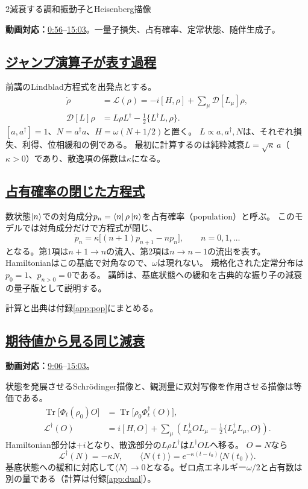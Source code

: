 \documentclass[a4paper,11pt]{ltjsarticle}
\newcommand{\subsectionlink}[1]{\subsection[#1]{\hyperlink{toc}{#1}}}
\numberwithin{equation}{section}
\newcommand{\Tr}{\operatorname{Tr}}
\newcommand{\Diss}{\mathcal{D}}
\newcommand{\av}[1]{\langle #1\rangle}
\newcommand{\video}[2]{\href{https://www.youtube.com/watch?v=RYxzcUhIHjk\&t=#1s}{#2}}
\newcommand{\videosource}[1]{\par\noindent\textcolor{noteblue}{\textbf{動画対応：}#1}\par\smallskip}
\begin{document}
\begin{lecturesection}{2}{減衰する調和振動子とHeisenberg描像}
\label{sec:damping}
\videosource{\video{56}{0:56}--\video{903}{15:03}。一量子損失、占有確率、定常状態、随伴生成子。}
\subsectionlink{ジャンプ演算子が表す過程}
前講のLindblad方程式を出発点とする。
\begin{align}
 \dot\rho&=\mathcal L(\rho)=-i[H,\rho]+\sum_\mu\Diss[L_\mu]\rho,
 \label{eq:lindblad}\\
 \Diss[L]\rho&=L\rho L^\dagger-\frac12\{L^\dagger L,\rho\}.
\end{align}
$[a,a^\dagger]=1$、$N=a^\dagger a$、$H=\omega(N+1/2)$と置く。
$L\propto a,a^\dagger,N$は、それぞれ損失、利得、位相緩和の例である。
最初に計算するのは純粋減衰$L=\sqrt\kappa\,a$（$\kappa>0$）であり、散逸項の係数は$\kappa$になる。

\subsectionlink{占有確率の閉じた方程式}
数状態$\ket n$での対角成分$p_n=\bra n\rho\ket n$を占有確率（population）と呼ぶ。
このモデルでは対角成分だけで方程式が閉じ、
\begin{equation}
 \dot p_n=\kappa\bigl[(n+1)p_{n+1}-np_n\bigr],\qquad n=0,1,\ldots
 \label{eq:pauli}
\end{equation}
となる。第1項は$n+1\to n$の流入、第2項は$n\to n-1$の流出を表す。
Hamiltonianはこの基底で対角なので、$\omega$は現れない。
規格化された定常分布は$p_0=1$、$p_{n>0}=0$である。
講師は、基底状態への緩和を古典的な振り子の減衰の量子版として説明する。

\par\noindent 計算と出典は付録\ref{app:pop}にまとめる。

\subsectionlink{期待値から見る同じ減衰}
\videosource{\video{546}{9:06}--\video{903}{15:03}。}
状態を発展させるSchr\"odinger描像と、観測量に双対写像を作用させる描像は等価である。
\begin{align}
 \Tr\bigl[\Phi_t(\rho_0)O\bigr]
   &=\Tr\bigl[\rho_0\Phi_t^\dagger(O)\bigr],\\
 \mathcal L^\dagger(O)
   &=i[H,O]+\sum_\mu\left(L_\mu^\dagger O L_\mu
       -\frac12\{L_\mu^\dagger L_\mu,O\}\right).
 \label{eq:dual}
\end{align}
Hamiltonian部分は$+i$となり、散逸部分の$L\rho L^\dagger$は$L^\dagger O L$へ移る。
$O=N$なら
\begin{equation}
 \mathcal L^\dagger(N)=-\kappa N,\qquad
 \av{N(t)}=e^{-\kappa(t-t_0)}\av{N(t_0)}.
 \label{eq:decayN}
\end{equation}
基底状態への緩和に対応して$\av N\to0$となる。ゼロ点エネルギー$\omega/2$と占有数は別の量である（計算は付録\ref{app:dual}）。

\end{lecturesection}
\end{document}
